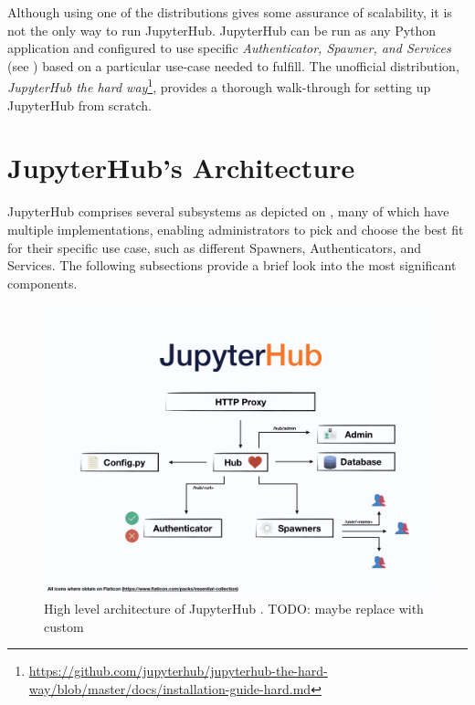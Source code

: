 \documentclass[
  digital,     %
  oneside,     %
  nosansbold,  %
  nocolorbold, %
  lof,         %
  lot,         %
]{fithesis4}
\begin{document}
Although using one of the distributions gives some assurance of scalability, it is not the only way to run JupyterHub. JupyterHub can be run as any Python application and configured to use specific \emph{Authenticator, Spawner, and Services} (see ) based on a particular use-case needed to fulfill. The unofficial distribution, \emph{JupyterHub the hard way}\footnote{\url{https://github.com/jupyterhub/jupyterhub-the-hard-way/blob/master/docs/installation-guide-hard.md}}, provides a thorough walk-through for setting up JupyterHub from scratch.


\section{JupyterHub's Architecture}
\label{subsec:jupyterhub:architecture}
JupyterHub comprises several subsystems as depicted on , many of which have multiple implementations, enabling administrators to pick and choose the best fit for their specific use case, such as different Spawners, Authenticators, and Services. The following subsections provide a brief look into the most significant components.

\begin{figure}[H]
  \begin{center}
  \includegraphics[width=\textwidth]{figures/jupyer-hub-architecture.jpeg}
  \end{center}
  \caption{High level architecture of JupyterHub \cite{jupyterhub}. TODO: maybe replace with custom}
  \label{fig:jupyter-hub-arch}
\end{figure}
\end{document}
